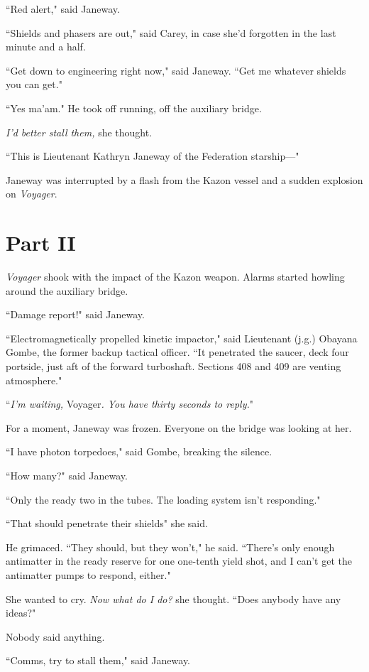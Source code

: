 \documentclass[twoside,letterpaper,12pt]{memoir}
\begin{document}
``Red alert," said Janeway.

``Shields and phasers are out," said Carey, in case she’d forgotten in the last minute and a half.

``Get down to engineering right now," said Janeway. ``Get me whatever shields you can get."

``Yes ma'am." He took off running, off the auxiliary bridge.

\textit{I'd better stall them, }she thought.

``This is Lieutenant Kathryn Janeway of the Federation starship---"

Janeway was interrupted by a flash from the Kazon vessel and a sudden explosion on \textit{Voyager}.

\chapter*{Part II}

\textit{Voyager} shook with the impact of the Kazon weapon. Alarms started howling around the auxiliary bridge.

``Damage report!" said Janeway.

``Electromagnetically propelled kinetic impactor," said Lieutenant (j.g.) Obayana Gombe, the former backup tactical officer. ``It penetrated the saucer, deck four portside, just aft of the forward turboshaft. Sections 408 and 409 are venting atmosphere."

``\textit{I'm waiting, }Voyager\textit{. You have thirty seconds to reply.}"

For a moment, Janeway was frozen. Everyone on the bridge was looking at her.

``I have photon torpedoes," said Gombe, breaking the silence.

``How many?" said Janeway.

``Only the ready two in the tubes. The loading system isn't responding."

``That should penetrate their shields" she said.

He grimaced. ``They should, but they won't," he said. ``There's only enough antimatter in the ready reserve for one one-tenth yield shot, and I can't get the antimatter pumps to respond, either."

She wanted to cry. \textit{Now what do I do?} she thought. ``Does anybody have any ideas?"

Nobody said anything.

``Comms, try to stall them," said Janeway.
\end{document}
